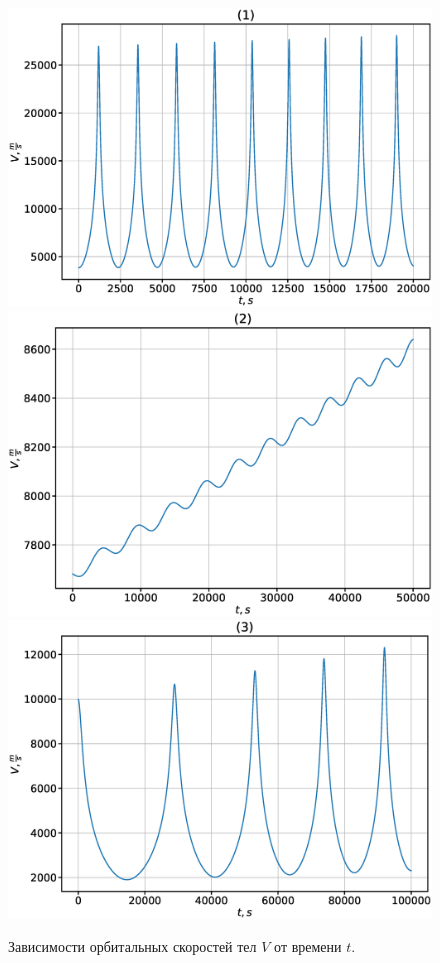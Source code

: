 \documentclass[12pt]{article}
\begin{document}
\begin{figure}[H]
      \includegraphics[width=1.0\linewidth]{V_t_1.eps}
    \endminipage\hfill
      \includegraphics[width=1.0\linewidth]{V_t_2.eps}
    \endminipage\hfill
      \includegraphics[width=1.0\linewidth]{V_t_3.eps}
    \endminipage
    \caption{Зависимости орбитальных скоростей тел $V$ от времени $t$.}
    \label{fig:2}
    \end{figure}
\end{document}
